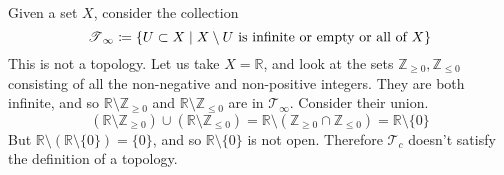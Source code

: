   \begin{example}
    Given a set $X$, consider the collection 
    \begin{equation}
      \operatorname{\mathscr{T}}_\infty \coloneqq \{U \subset X \mid X \setminus U \text{ is infinite or empty or all of }X \}
    \end{equation}
    This is not a topology. Let us take $X = \mathbb{R}$, and look at the sets $\mathbb{Z}_{\geq 0}, \mathbb{Z}_{\leq 0}$ consisting of all the non-negative and non-positive integers. They are both infinite, and so $\mathbb{R} \setminus \mathbb{Z}_{\geq 0}$ and $\mathbb{R} \setminus \mathbb{Z}_{\leq 0}$ are in $\mathcal{T}_\infty$. Consider their union. 
    \begin{equation}
      (\mathbb{R} \setminus \mathbb{Z}_{\geq 0}) \cup (\mathbb{R} \setminus \mathbb{Z}_{\leq 0}) = \mathbb{R} \setminus (\mathbb{Z}_{\geq 0} \cap \mathbb{Z}_{\leq 0}) = \mathbb{R} \setminus \{0\}
    \end{equation}
    But $\mathbb{R} \setminus (\mathbb{R} \setminus \{0\}) = \{0\}$, and so $\mathbb{R} \setminus \{0\}$ is not open. Therefore $\mathcal{T}_c$ doesn't satisfy the definition of a topology. 
  \end{example}

